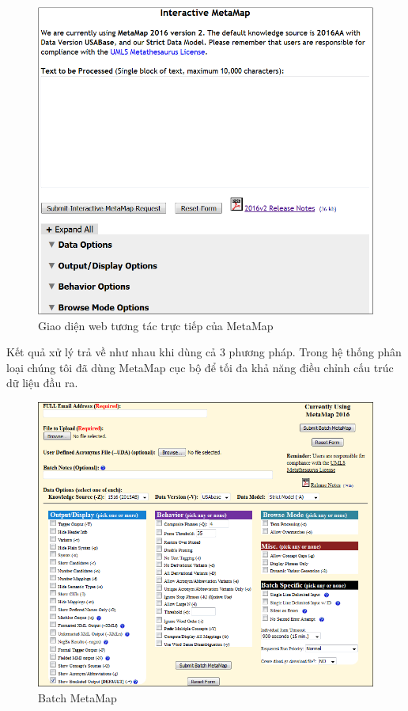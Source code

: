 \begin{figure}[h]
\centering
\includegraphics[scale=0.6]{../hinh/mmweb.png}
\caption{Giao diện web tương tác trực tiếp của MetaMap}
\label{fig:mmweb}
\end{figure}

Kết quả xử lý trả về như nhau khi dùng cả 3 phương pháp. Trong hệ thống phân loại chúng tôi đã dùng MetaMap cục bộ để tối đa khả năng điều chỉnh cấu trúc dữ liệu đầu ra. \\

\begin{figure}[h]
\centering
\includegraphics[scale=0.7]{../hinh/batchmm.png}
\caption{Batch MetaMap}
\label{fig:batchmm}
\end{figure}

